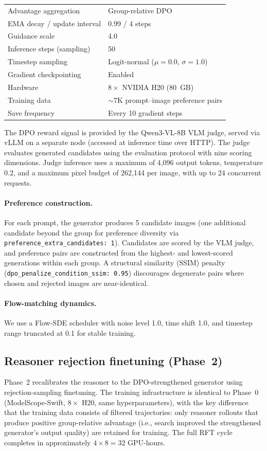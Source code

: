 \begin{table}[t]
\begin{tabularx}{\linewidth}{lX}
    Advantage aggregation & Group-relative DPO \\
    EMA decay / update interval & 0.99 / 4 steps \\
    Guidance scale & 4.0 \\
    Inference steps (sampling) & 50 \\
    Timestep sampling & Logit-normal ($\mu{=}0.0$, $\sigma{=}1.0$) \\
    Gradient checkpointing & Enabled \\
    Hardware & $8 \times$ NVIDIA H20 (80~GB) \\
    Training data & ${\sim}7$K prompt--image preference pairs \\
    Save frequency & Every 10 gradient steps \\
    \bottomrule
  \end{tabularx}
\end{table}

The DPO reward signal is provided by the Qwen3-VL-8B VLM judge, served via vLLM on a separate node (accessed at inference time over HTTP).
The judge evaluates generated candidates using the \dataset{} evaluation protocol with nine scoring dimensions.
Judge inference uses a maximum of 4{,}096 output tokens, temperature 0.2, and a maximum pixel budget of 262{,}144 per image, with up to 24 concurrent requests.

\paragraph{Preference construction.}
For each prompt, the generator produces 5 candidate images (one additional candidate beyond the group for preference diversity via \texttt{preference\_extra\_candidates: 1}).
Candidates are scored by the VLM judge, and preference pairs are constructed from the highest- and lowest-scored generations within each group.
A structural similarity (SSIM) penalty (\texttt{dpo\_penalize\_condition\_ssim: 0.95}) discourages degenerate pairs where chosen and rejected images are near-identical.

\paragraph{Flow-matching dynamics.}
We use a Flow-SDE scheduler with noise level 1.0, time shift 1.0, and timestep range truncated at 0.1 for stable training.

\subsection{Reasoner rejection finetuning (Phase~2)}
Phase~2 recalibrates the reasoner to the DPO-strengthened generator using rejection-sampling finetuning.
The training infrastructure is identical to Phase~0 (ModelScope-Swift, $8 \times$ H20, same hyperparameters), with the key difference that the training data consists of filtered trajectories: only reasoner rollouts that produce positive group-relative advantage (i.e., search improved the strengthened generator's output quality) are retained for training.
The full RFT cycle completes in approximately $4 \times 8 = 32$ GPU-hours.

